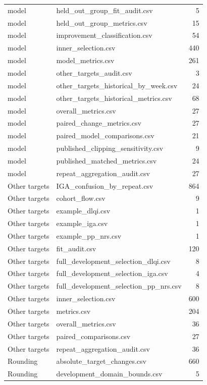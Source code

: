 \begin{longtable}{p{20mm}p{115mm}r}
model & held\_out\_group\_fit\_audit.csv & 5 \\
model & held\_out\_group\_metrics.csv & 15 \\
model & improvement\_classification.csv & 54 \\
model & inner\_selection.csv & 440 \\
model & model\_metrics.csv & 261 \\
model & other\_targets\_audit.csv & 3 \\
model & other\_targets\_historical\_by\_week.csv & 24 \\
model & other\_targets\_historical\_metrics.csv & 68 \\
model & overall\_metrics.csv & 27 \\
model & paired\_change\_metrics.csv & 27 \\
model & paired\_model\_comparisons.csv & 21 \\
model & published\_clipping\_sensitivity.csv & 9 \\
model & published\_matched\_metrics.csv & 24 \\
model & repeat\_aggregation\_audit.csv & 27 \\
Other targets & IGA\_confusion\_by\_repeat.csv & 864 \\
Other targets & cohort\_flow.csv & 9 \\
Other targets & example\_dlqi.csv & 1 \\
Other targets & example\_iga.csv & 1 \\
Other targets & example\_pp\_nrs.csv & 1 \\
Other targets & fit\_audit.csv & 120 \\
Other targets & full\_development\_selection\_dlqi.csv & 8 \\
Other targets & full\_development\_selection\_iga.csv & 4 \\
Other targets & full\_development\_selection\_pp\_nrs.csv & 8 \\
Other targets & inner\_selection.csv & 600 \\
Other targets & metrics.csv & 204 \\
Other targets & overall\_metrics.csv & 36 \\
Other targets & paired\_comparisons.csv & 27 \\
Other targets & repeat\_aggregation\_audit.csv & 36 \\
Rounding & absolute\_target\_changes.csv & 660 \\
Rounding & development\_domain\_bounds.csv & 5 \\

\end{longtable}
